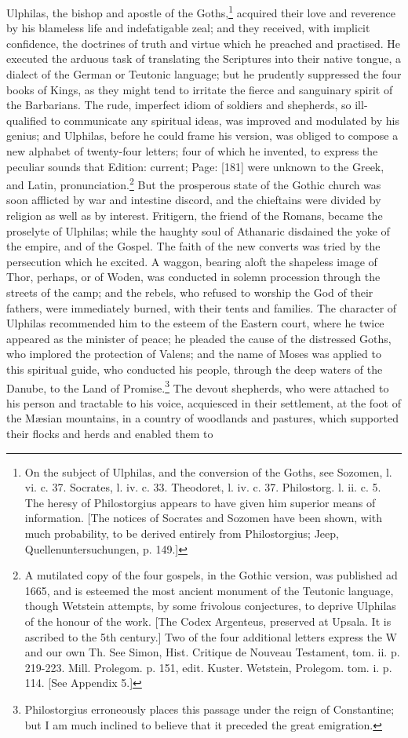 Ulphilas, the bishop and apostle of the Goths,\footnote{On the subject of Ulphilas, and the conversion of the Goths, see Sozomen, l. vi. c. 37. Socrates, l. iv. c. 33. Theodoret, l. iv. c. 37. Philostorg. l. ii. c. 5. The heresy of Philostorgius appears to have given him superior means of information. [The notices of Socrates and Sozomen have been shown, with much probability, to be derived entirely from Philostorgius; Jeep, Quellenuntersuchungen, p. 149.]} acquired their love and reverence by his blameless life and indefatigable zeal; and they received, with implicit confidence, the doctrines of truth and virtue which he preached and practised. He executed the arduous task of translating the Scriptures into their native tongue, a dialect of the German or Teutonic language; but he prudently suppressed the four books of Kings, as they might tend to irritate the fierce and sanguinary spirit of the Barbarians. The rude, imperfect idiom of soldiers and shepherds, so ill-qualified to communicate any spiritual ideas, was improved and modulated by his genius; and Ulphilas, before he could frame his version, was obliged to compose a new alphabet of twenty-four letters; four of which he invented, to express the peculiar sounds that Edition: current; Page: [181] were unknown to the Greek, and Latin, pronunciation.\footnote{A mutilated copy of the four gospels, in the Gothic version, was published ad 1665, and is esteemed the most ancient monument of the Teutonic language, though Wetstein attempts, by some frivolous conjectures, to deprive Ulphilas of the honour of the work. [The Codex Argenteus, preserved at Upsala. It is ascribed to the 5th century.] Two of the four additional letters express the W and our own Th. See Simon, Hist. Critique de Nouveau Testament, tom. ii. p. 219-223. Mill. Prolegom. p. 151, edit. Kuster. Wetstein, Prolegom. tom. i. p. 114. [See Appendix 5.]} But the prosperous state of the Gothic church was soon afflicted by war and intestine discord, and the chieftains were divided by religion as well as by interest. Fritigern, the friend of the Romans, became the proselyte of Ulphilas; while the haughty soul of Athanaric disdained the yoke of the empire, and of the Gospel. The faith of the new converts was tried by the persecution which he excited. A waggon, bearing aloft the shapeless image of Thor, perhaps, or of Woden, was conducted in solemn procession through the streets of the camp; and the rebels, who refused to worship the God of their fathers, were immediately burned, with their tents and families. The character of Ulphilas recommended him to the esteem of the Eastern court, where he twice appeared as the minister of peace; he pleaded the cause of the distressed Goths, who implored the protection of Valens; and the name of Moses was applied to this spiritual guide, who conducted his people, through the deep waters of the Danube, to the Land of Promise.\footnote{Philostorgius erroneously places this passage under the reign of Constantine; but I am much inclined to believe that it preceded the great emigration.} The devout shepherds, who were attached to his person and tractable to his voice, acquiesced in their settlement, at the foot of the Mæsian mountains, in a country of woodlands and pastures, which supported their flocks and herds and enabled them to 